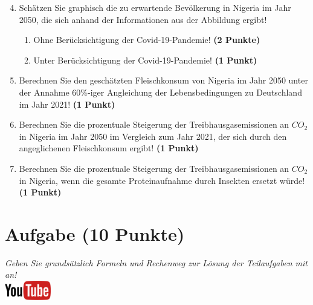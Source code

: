 \documentclass[a4paper, 10pt]{scrartcl}\usepackage[]{graphicx}\usepackage[]{xcolor}
\begin{document}
\begin{enumerate}
  \setcounter{enumi}{3}  
\item Sch{\"a}tzen Sie graphisch die zu erwartende Bev{\"o}lkerung in Nigeria im Jahr 2050, die sich
  anhand der Informationen aus der Abbildung ergibt!
\begin{enumerate}
\item Ohne Ber{\"u}cksichtigung der Covid-19-Pandemie! \textbf{(2
    Punkte)}
\item Unter Ber{\"u}cksichtigung der Covid-19-Pandemie! \textbf{(1
    Punkt)}
\end{enumerate}
\item Berechnen Sie den gesch{\"a}tzten Fleischkonsum von Nigeria im Jahr
  2050 unter der Annahme 60\%-iger Angleichung der Lebensbedingungen zu
  Deutschland im Jahr 2021! \textbf{(1 Punkt)}
\item Berechnen Sie die prozentuale Steigerung der Treibhausgasemissionen
  an $CO_2$ in Nigeria im Jahr 2050 im Vergleich zum Jahr 2021, der sich durch den
  angeglichenen Fleischkonsum ergibt! \textbf{(1
    Punkt)}
\item Berechnen Sie die prozentuale Steigerung der Treibhausgasemissionen
  an $CO_2$ in Nigeria, wenn die gesamte Proteinaufnahme 
  durch Insekten ersetzt w{\"u}rde! \textbf{(1
    Punkt)}
\end{enumerate}







 
\clearpage

\section{Aufgabe \hfill (10 Punkte)}

\textit{Geben Sie grunds{\"a}tzlich Formeln und Rechenweg zur L{\"o}sung der
  Teilaufgaben mit an!} \\[1Ex]

\hfill\href{https://youtu.be/8Pb2sKUIMyk}{\includegraphics[width =
  2cm]{img/youtube}} %
\hspace{2Ex}
\end{document}
